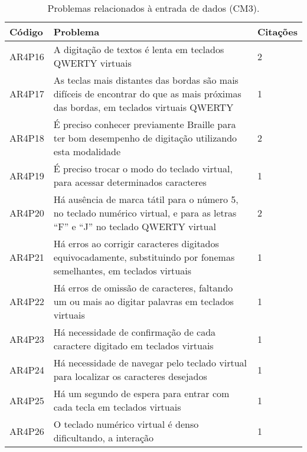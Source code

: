 \begin{table}[htb]
  \begin{center}
    \ABNTEXfontereduzida
    \caption{Problemas relacionados à entrada de dados (CM3).}
    \label{tab-pro-ent-dad-1}
    \begin{tabular}{p{1.2cm}|p{12.0cm}|p{1.3cm}}
      \textbf{Código} & \textbf{Problema}                                                                                                                  & \textbf{Citações} \\
      \hline
      AR4P16          & A digitação de textos é lenta em teclados QWERTY virtuais                                                                          & 2                 \\
      \hline
      AR4P17          & As teclas mais distantes das bordas são mais difíceis de encontrar do que as mais próximas das bordas, em teclados virtuais QWERTY & 1                 \\
      \hline
      AR4P18          & É preciso conhecer previamente Braille para ter bom desempenho de digitação utilizando esta modalidade                             & 2                 \\
      \hline
      AR4P19          & É preciso trocar o modo do teclado virtual, para acessar determinados caracteres                                                   & 1                 \\
      \hline
      AR4P20          & Há ausência de marca tátil para o número 5, no teclado numérico virtual, e para as letras “F” e “J” no teclado QWERTY virtual      & 2                 \\
      \hline
      AR4P21          & Há erros ao corrigir caracteres digitados equivocadamente, substituindo por fonemas semelhantes, em teclados virtuais              & 1                 \\
      \hline
      AR4P22          & Há erros de omissão de caracteres, faltando um ou mais ao digitar palavras em teclados virtuais                                    & 1                 \\
      \hline
      AR4P23          & Há necessidade de confirmação de cada caractere digitado em teclados virtuais                                                      & 1                 \\
      \hline
      AR4P24          & Há necessidade de navegar pelo teclado virtual para localizar os caracteres desejados                                              & 1                 \\
      \hline
      AR4P25          & Há um segundo de espera para entrar com cada tecla em teclados virtuais                                                            & 1                 \\
      \hline
      AR4P26          & O teclado numérico virtual é denso dificultando, a interação                                                                       & 1                 \\
    \end{tabular}
  \end{center}
\end{table}

